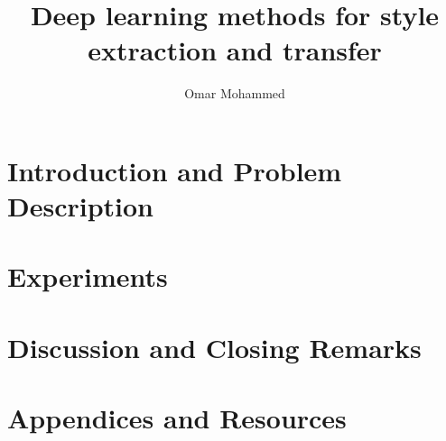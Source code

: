\documentclass[11pt,a4paper,twoside, leqno]{book}
\title{Deep learning methods for style extraction and transfer}
\author{Omar Mohammed}
\date{}
\begin{document}
\maketitle

\dominitoc%
\tableofcontents

\listoffigures

\listoftables

\part{Introduction and Problem Description}





\part{Experiments}






\part{Discussion and Closing Remarks}




\part{Appendices and Resources}
\appendix





\end{document}
